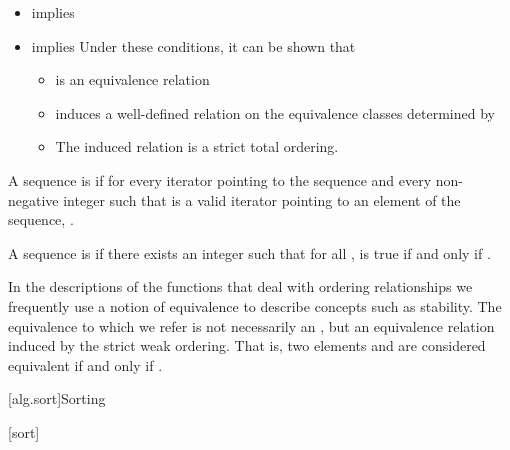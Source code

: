 \begin{itemize}
\item
{}
implies
\item
{}
implies
\enternote
Under these conditions, it can be shown that
\begin{itemize}
\item
{}
is an equivalence relation
\item
{}
induces a well-defined relation on the equivalence
classes determined by
\item
The induced relation is a strict total ordering.
\exitnote
\end{itemize}
\end{itemize}

\pnum
A sequence is
 if for every iterator
pointing to the sequence and every non-negative integer
such that
is a valid iterator pointing to an element of the sequence,
.

\pnum
A sequence
is
if there exists an integer
such that for all
,
is true if and only if
.

\pnum
In the descriptions of the functions that deal with ordering relationships we frequently use a notion of
equivalence to describe concepts such as stability.
The equivalence to which we refer is not necessarily an
,
but an equivalence relation induced by the strict weak ordering.
That is, two elements
and
are considered equivalent if and only if
.

[alg.sort]{Sorting}

[sort]{}

